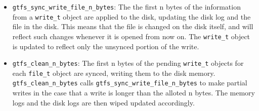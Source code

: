 \documentclass{article}
\begin{document}
\begin{itemize}
    \item \texttt{gtfs\_sync\_write\_file\_n\_bytes}: The the first n bytes of the information from a \texttt{write\_t} object are applied to the disk, updating the disk log and the file in the disk. This means that the file is changed on the disk itself, and will reflect such changes whenever it is opened from now on. The \texttt{write\_t} object is updated to reflect only the unsynced portion of the write.
    \item \texttt{gtfs\_clean\_n\_bytes}: The first n bytes of the pending \texttt{write\_t} objects for each \texttt{file\_t} object are synced, writing them to the disk memory. \texttt{gtfs\_clean\_n\_bytes} calls \texttt{gtfs\_sync\_write\_file\_n\_bytes} to make partial writes in the case that a write is longer than the alloted n bytes. The memory logs and the disk logs are then wiped updated accordingly.
\end{itemize}
\end{document}
